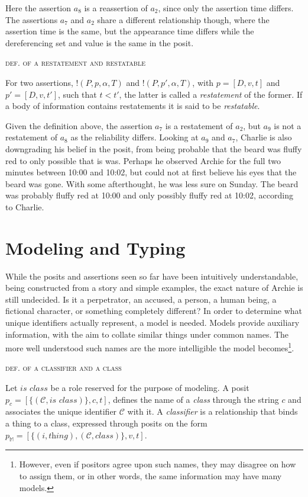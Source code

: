 \documentclass[sfsidenotes,nobib,twoside,symmetric]{tufte-handout}
\newcommand{\assert}{\text{!}}
\newcounter{majorcount}
\newcommand{\deffy}[3]{
	\vspace{2ex}
	\refstepcounter{majorcount} 
	\noindent\textsc{#1}%
	\\\begin{small}
	\noindent #2%
	\label{Def:#3}
	\end{small}
	\vspace{2ex}
}
\begin{document}
Here the assertion $a_8$ is a reassertion of $a_2$, since only the assertion time differs. The assertions $a_7$ and $a_2$ share a different relationship though, where the assertion time is the same, but the appearance time differs while the dereferencing set and value is the same in the posit.
 
\deffy{def. of a restatement and restatable}{%
For two assertions, $\assert(P, p, \alpha, T)$ and $\assert(P, p', \alpha, T)$, with $p = [D,v,t]$ and $p' = [D,v,t']$, such that $t < t'$, the latter is called a \emph{restatement} of the former. If a body of information contains restatements it is said to be \emph{restatable}.
}{restatable}

Given the definition above, the assertion $a_7$ is a restatement of $a_2$, but $a_9$ is not a restatement of $a_8$ as the reliability differs. Looking at $a_9$ and $a_7$, Charlie is also downgrading his belief in the posit, from being probable that the beard was fluffy red to only possible that is was. Perhaps he observed Archie for the full two minutes between 10:00 and 10:02, but could not at first believe his eyes that the beard was gone. With some afterthought, he was less sure on Sunday. The beard was probably fluffy red at 10:00 and only possibly fluffy red at 10:02, according to Charlie. 


\section{Modeling and Typing}
%
While the posits and assertions seen so far have been intuitively understandable, being constructed from a story and simple examples, the exact nature of Archie is still undecided. Is it a perpetrator, an accused, a person, a human being, a fictional character, or something completely different? In order to determine what unique identifiers actually represent, a model is needed. Models provide auxiliary information, with the aim to collate similar things under common names. The more well understood such names are the more intelligible the model becomes\footnote{However, even if positors agree upon such names, they may disagree on how to assign them, or in other words, the same information may have many models.}.

\deffy{def. of a classifier and a class}{%
Let $\textit{is class}$ be a role reserved for the purpose of modeling. A posit $p_c = [\{(\mathcal{C}, \textit{is class})\}, c, t]$, defines the name of a \emph{class} through the string $c$ and associates the unique identifier $\mathcal{C}$ with it. A \emph{classifier} is a relationship that binds a thing to a class, expressed through posits on the form $p_{\mathbb{M}} = [\{(i, \textit{thing}), (\mathcal{C}, \textit{class})\}, v, t]$.
}{classifier}
\end{document}
